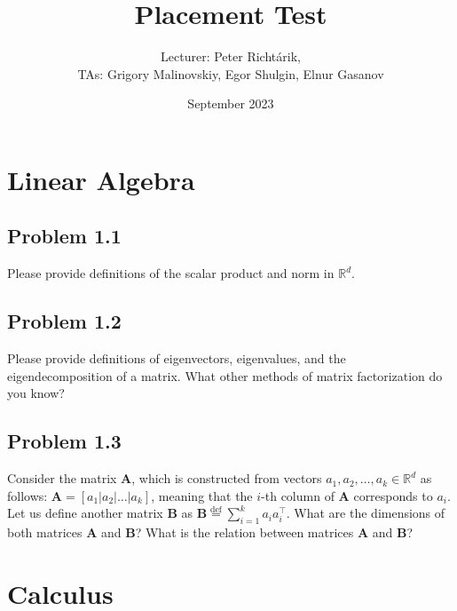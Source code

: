 \documentclass{article}
\title{Placement Test}
\author{Lecturer: Peter Richt\'{a}rik, \\
TAs:	Grigory Malinovskiy, Egor Shulgin, Elnur Gasanov}
\date{September 2023}
\begin{document}
	
	\maketitle

\iffalse	
	This is a test for the professor and teaching assistant to assess the audience's level. Please do not worry if you do not know or remember something. Feel free to share your thoughts and ideas on each question.
	\fi
	
	
	\section{Linear Algebra}
	\subsection*{Problem 1.1}
	Please provide definitions of the scalar product and norm in $\mathbb{R}^d$. %
	
	\vspace{40 pt}
	
	\subsection*{Problem 1.2}
	Please provide definitions of eigenvectors, eigenvalues, and the eigendecomposition of a matrix. %
	What other methods of matrix factorization do you know?
	
	\vspace{50 pt}
	
	\subsection*{Problem 1.3}
	
	Consider the matrix $\textbf{A}$, which is constructed from vectors $a_1, a_2, \dots, a_k \in \mathbb{R}^d$ as follows: $\textbf{A} = [a_1 | a_2 | \dots | a_k]$, meaning that the $i$-th column of $\textbf{A}$ corresponds to $a_i$. Let us define another matrix $\textbf{B}$ as $\textbf{B}\overset{\text{def}}{=} \sum\limits_{i=1}^k a_i a_i^\top$. What are the dimensions of both matrices $\textbf{A}$ and $\textbf{B}$? What is the relation between matrices $\textbf{A}$ and $\textbf{B}$?
	
	\vspace{50 pt}
	
	\section{Calculus}
	
\end{document}
